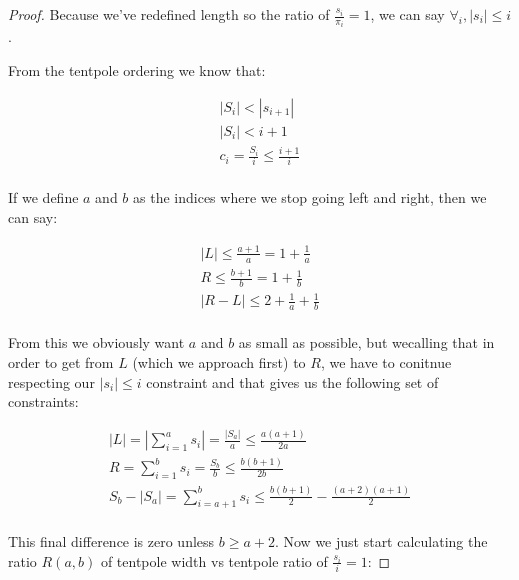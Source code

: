 \documentclass[11pt,twocolumn]{article}
\begin{document}
\begin{proof}
Because we've redefined length so the ratio of $\frac{s_i}{\pi_i} = 1$, we can say $\forall_i, |s_i | \leq i$.

From the tentpole ordering we know that:

\begin{align*}
|S_i| < |s_{i+1}| \\
|S_i| < i+1 \\
c_i = \frac{S_i}{i} \leq \frac{i+1}{i} \\
\end{align*}

If we define $a$ and $b$ as the indices where we stop going left and right, then we can say:

\begin{align*}
|L| \leq \frac{a+1}{a} = 1 + \frac{1}{a}\\
R \leq \frac{b+1}{b} = 1 + \frac{1}{b}\\
|R-L| \leq 2 + \frac{1}{a} + \frac{1}{b} \\
\end{align*}

From this we obviously want $a$ and $b$ as small as possible, but wecalling that in order to get from $L$ (which we approach first) to $R$, we have to conitnue respecting our $|s_i| \leq i$ constraint and that gives us the following set of constraints:

\begin{align*}
|L| = |\sum_{i=1}^a s_i| = \frac{|S_a|}{a} \leq \frac{a(a+1)}{2a} \\
R = \sum_{i=1}^b s_i = \frac{S_b}{b} \leq \frac{b(b+1)}{2b} \\
S_b - |S_a| =  \sum_{i = a+1}^b s_i \leq \frac{b(b+1)}{2} - \frac{(a+2)(a+1)}{2} \\
\end{align*}

This final difference is zero unless $b \geq a+2$. Now we just start calculating the ratio $R(a,b)$ of tentpole width vs tentpole ratio of $\frac{s_i}{i} = 1$:



\end{proof}
\end{document}
